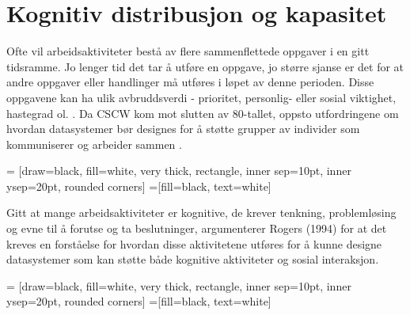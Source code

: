 \section{Kognitiv distribusjon og kapasitet}
\label{chp: kognisjon}

Ofte vil arbeidsaktiviteter bestå av flere sammenflettede oppgaver i en gitt tidsramme. Jo lenger tid det tar å utføre en oppgave, jo større sjanse er det for at andre oppgaver eller handlinger må utføres i løpet av denne perioden. Disse oppgavene kan ha ulik avbruddsverdi - prioritet, personlig- eller sosial viktighet, hastegrad ol. \cite{Rogers94}. 
Da CSCW kom mot slutten av 80-tallet, oppsto utfordringene om hvordan datasystemer bør designes for å støtte grupper av individer som kommuniserer og arbeider sammen \cite{Rogers94}. 

 = [draw=black, fill=white, very thick,
    rectangle, inner sep=10pt, inner ysep=20pt, rounded corners]
 =[fill=black, text=white]
%


\noindent
Gitt at mange arbeidsaktiviteter er kognitive, de krever tenkning, problemløsing og evne til å forutse og ta beslutninger, argumenterer Rogers (1994) for at det kreves en forståelse for hvordan disse aktivitetene utføres for å kunne designe datasystemer som kan støtte både kognitive aktiviteter og sosial interaksjon.

 = [draw=black, fill=white, very thick,
    rectangle, inner sep=10pt, inner ysep=20pt, rounded corners]
 =[fill=black, text=white]
%

